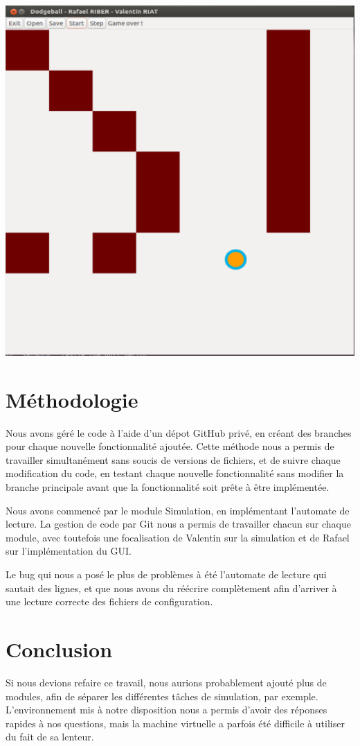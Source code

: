 \documentclass[a4paper, 11pt]{article}
\begin{document}
\begin{minipage}{0.33333333\textwidth}
\includegraphics[width=\textwidth]{figures/sim10.PNG}
\end{minipage}

\section{Méthodologie}

Nous avons géré le code à l'aide d'un dépot GitHub privé, en créant des branches pour chaque nouvelle fonctionnalité ajoutée. Cette méthode nous a permis de travailler simultanément sans soucis de versions de fichiers, et de suivre chaque modification du code, en testant chaque nouvelle fonctionnalité sans modifier la branche principale avant que la fonctionnalité soit prête à être implémentée.

Nous avons commencé par le module Simulation, en implémentant l'automate de lecture. La gestion de code par Git nous a permis de travailler chacun sur chaque module, avec toutefois une focalisation de Valentin sur la simulation et de Rafael sur l'implémentation du GUI.

Le bug qui nous a posé le plus de problèmes à été l'automate de lecture qui sautait des lignes, et que nous avons du réécrire complètement afin d'arriver à une lecture correcte des fichiers de configuration.

\section{Conclusion}

Si nous devions refaire ce travail, nous aurions probablement ajouté plus de modules, afin de séparer les différentes tâches de simulation, par exemple. L'environnement mis à notre disposition nous a permis d'avoir des réponses rapides à nos questions, mais la machine virtuelle a parfois été difficile à utiliser du fait de sa lenteur.
\end{document}
